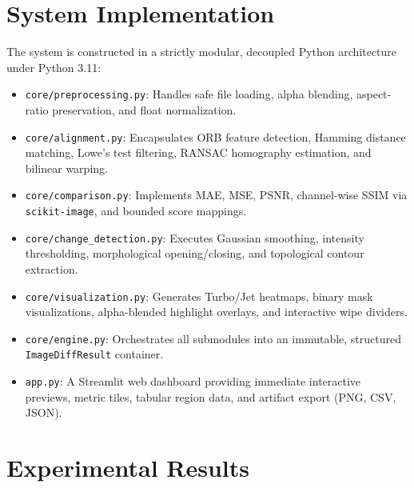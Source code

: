 \documentclass[conference]{IEEEtran}
\begin{document}
\section{System Implementation}
The system is constructed in a strictly modular, decoupled Python architecture under Python 3.11:
\begin{itemize}
    \item \texttt{core/preprocessing.py}: Handles safe file loading, alpha blending, aspect-ratio preservation, and float normalization.
    \item \texttt{core/alignment.py}: Encapsulates ORB feature detection, Hamming distance matching, Lowe's test filtering, RANSAC homography estimation, and bilinear warping.
    \item \texttt{core/comparison.py}: Implements MAE, MSE, PSNR, channel-wise SSIM via \texttt{scikit-image}, and bounded score mappings.
    \item \texttt{core/change\_detection.py}: Executes Gaussian smoothing, intensity thresholding, morphological opening/closing, and topological contour extraction.
    \item \texttt{core/visualization.py}: Generates Turbo/Jet heatmaps, binary mask visualizations, alpha-blended highlight overlays, and interactive wipe dividers.
    \item \texttt{core/engine.py}: Orchestrates all submodules into an immutable, structured \texttt{ImageDiffResult} container.
    \item \texttt{app.py}: A Streamlit web dashboard providing immediate interactive previews, metric tiles, tabular region data, and artifact export (PNG, CSV, JSON).
\end{itemize}

\section{Experimental Results}
\end{document}
